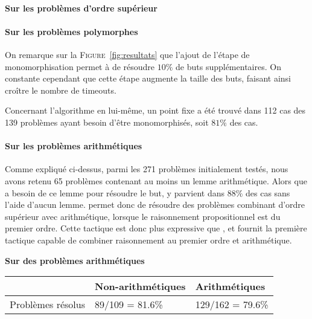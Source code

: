 \paragraph {Sur les problèmes d'ordre supérieur}

\todo


\paragraph {Sur les problèmes polymorphes}
On remarque sur la \textsc{Figure}~\ref{fig:resultats} que l'ajout de
l'étape de monomorphisation permet à \beagletac de résoudre $10\%$ de
buts supplémentaires. On constante cependant que cette étape augmente la
taille des buts, faisant ainsi croître le nombre de timeouts.

Concernant l'algorithme en lui-même, un point fixe a été trouvé dans 112
cas des 139 problèmes ayant besoin d'être monomorphisés, soit $81\%$ des
cas.


\paragraph {Sur les problèmes arithmétiques}
Comme expliqué ci-dessus, parmi les 271 problèmes initialement testés,
nous avons retenu 65 problèmes contenant au moins un lemme arithmétique.
Alors que \metistac a besoin de ce lemme pour résoudre le but,
\beagletac y parvient dans $88\%$ des cas sans l'aide d'aucun lemme.
\beagletac permet donc de résoudre des problèmes combinant d'ordre
supérieur avec arithmétique, lorsque le raisonnement propositionnel est
du premier ordre. Cette tactique est donc plus expressive que \metistac,
et fournit la première tactique \holfour capable de combiner
raisonnement au premier ordre et arithmétique.


\textbf{Sur des problèmes arithmétiques}

\noindent \begin{tabularx}{\textwidth}{|X|X|X|}
\hline
$ $ & Non-arithmétiques & Arithmétiques \\ \hline
Problèmes résolus & 89/109 = 81.6\% & 129/162 = 79.6\% \\\hline
\end{tabularx}



